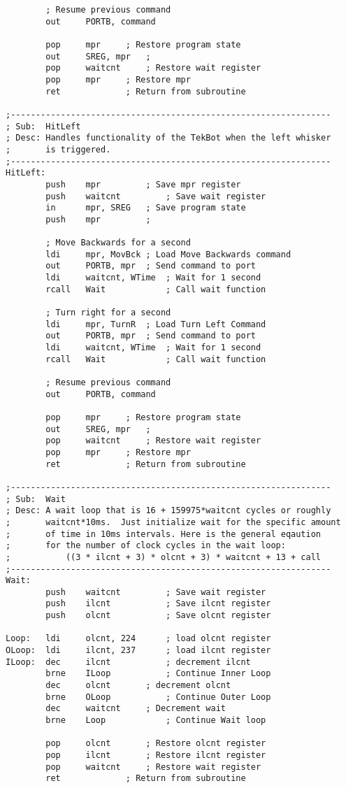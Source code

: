 \documentclass[12pt,letterpaper]{article}
\begin{document}
\begin{verbatim}
        ; Resume previous command
        out     PORTB, command

        pop     mpr     ; Restore program state
        out     SREG, mpr   ;
        pop     waitcnt     ; Restore wait register
        pop     mpr     ; Restore mpr
        ret             ; Return from subroutine

;----------------------------------------------------------------
; Sub:  HitLeft
; Desc: Handles functionality of the TekBot when the left whisker
;       is triggered.
;----------------------------------------------------------------
HitLeft:
        push    mpr         ; Save mpr register
        push    waitcnt         ; Save wait register
        in      mpr, SREG   ; Save program state
        push    mpr         ;

        ; Move Backwards for a second
        ldi     mpr, MovBck ; Load Move Backwards command
        out     PORTB, mpr  ; Send command to port
        ldi     waitcnt, WTime  ; Wait for 1 second
        rcall   Wait            ; Call wait function

        ; Turn right for a second
        ldi     mpr, TurnR  ; Load Turn Left Command
        out     PORTB, mpr  ; Send command to port
        ldi     waitcnt, WTime  ; Wait for 1 second
        rcall   Wait            ; Call wait function

        ; Resume previous command
        out     PORTB, command

        pop     mpr     ; Restore program state
        out     SREG, mpr   ;
        pop     waitcnt     ; Restore wait register
        pop     mpr     ; Restore mpr
        ret             ; Return from subroutine

;----------------------------------------------------------------
; Sub:  Wait
; Desc: A wait loop that is 16 + 159975*waitcnt cycles or roughly 
;       waitcnt*10ms.  Just initialize wait for the specific amount 
;       of time in 10ms intervals. Here is the general eqaution
;       for the number of clock cycles in the wait loop:
;           ((3 * ilcnt + 3) * olcnt + 3) * waitcnt + 13 + call
;----------------------------------------------------------------
Wait:
        push    waitcnt         ; Save wait register
        push    ilcnt           ; Save ilcnt register
        push    olcnt           ; Save olcnt register

Loop:   ldi     olcnt, 224      ; load olcnt register
OLoop:  ldi     ilcnt, 237      ; load ilcnt register
ILoop:  dec     ilcnt           ; decrement ilcnt
        brne    ILoop           ; Continue Inner Loop
        dec     olcnt       ; decrement olcnt
        brne    OLoop           ; Continue Outer Loop
        dec     waitcnt     ; Decrement wait 
        brne    Loop            ; Continue Wait loop    

        pop     olcnt       ; Restore olcnt register
        pop     ilcnt       ; Restore ilcnt register
        pop     waitcnt     ; Restore wait register
        ret             ; Return from subroutine
\end{verbatim}
\end{document}
